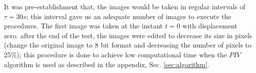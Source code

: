 It was pre-establishment that, the images would be taken in regular intervals of $\tau=30s$; 
this interval gave us an adequate number of images to execute the procedures. 
The first image was taken at the instant $t=0$ with displacement zero.
after the end of the test, the images were edited to decrease its size in pixels
(change the original image to 8 bit format and decreasing the number of pixels to 25\%);
this procedure is done to  achieve low computational time when
the $PIV$ algorithm is used as described in the appendix, Sec. \ref{sec:algorithm}.
